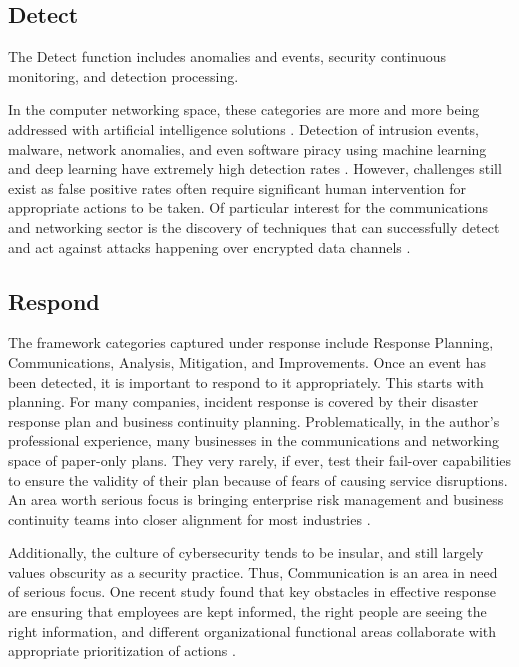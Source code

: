 \subsection{Detect}

The Detect function includes anomalies and events, security continuous monitoring, and detection processing.

In the computer networking space, these categories are more and more being addressed with artificial intelligence solutions \parencite{sarkerCybersecurityDataScience2020}. Detection of intrusion events, malware, network anomalies, and even software piracy using machine learning and deep learning have extremely high detection rates \parencite{chaudharyReviewVariousChallenges2020}. However, challenges still exist as false positive rates often require significant human intervention for appropriate actions to be taken. Of particular interest for the communications and networking sector is the discovery of techniques that can successfully detect and act against attacks happening over encrypted data channels \parencite{garciaDistributedRealtimeSlowDoS2021}.

\subsection{Respond}

The framework categories captured under response include Response Planning, Communications, Analysis, Mitigation, and Improvements. Once an event has been detected, it is important to respond to it appropriately. This starts with planning. For many companies, incident response is covered by their disaster response plan and business continuity planning. Problematically, in the author's professional experience, many businesses in the communications and networking space of paper-only plans. They very rarely, if ever, test their fail-over capabilities to ensure the validity of their plan because of fears of causing service disruptions. An area worth serious focus is bringing enterprise risk management and business continuity teams into closer alignment for most industries \parencite{russoConnectingDisasterDots2019}.

Additionally, the culture of cybersecurity tends to be insular, and still largely values obscurity as a security practice. Thus, Communication is an area in need of serious focus. One recent study found that key obstacles in effective response are ensuring that employees are kept informed, the right people are seeing the right information, and different organizational functional areas collaborate with appropriate prioritization of actions \parencite{ioannouCybersecurityCultureComputer2019}.

